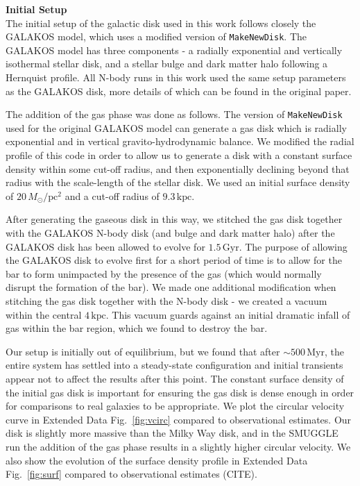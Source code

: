 \documentclass{natureprintstyle}
\begin{document}
\noindent
{\bf Initial Setup}
\\
\noindent
The initial setup of the galactic disk used in this work follows closely the
GALAKOS model\cite{2020ApJ...890..117D}, which uses a modified version of
\texttt{MakeNewDisk}.\cite{2005MNRAS.361..776S} The GALAKOS model has three
components - a radially exponential and vertically isothermal stellar disk,
and a stellar bulge and dark matter halo following a Hernquist
profile.\cite{1990ApJ...356..359H} All N-body runs in this work used the same
setup parameters as the GALAKOS disk, more details of which can be found in
the original paper.

The addition of the gas phase was done as follows. The version of
\texttt{MakeNewDisk} used for the original GALAKOS model can generate a gas
disk which is radially exponential and in vertical gravito-hydrodynamic
balance. We modified the radial profile of this code in order to allow us to
generate a disk with a constant surface density within some cut-off radius,
and then exponentially declining beyond that radius with the scale-length of
the stellar disk. We used an initial surface density of
$20\,M_{\odot}/\textrm{pc}^2$ and a cut-off radius of $9.3\,\textrm{kpc}$.

After generating the gaseous disk in this way, we stitched the gas disk
together with the GALAKOS N-body disk (and bulge and dark matter halo) after
the GALAKOS disk has been allowed to evolve for $1.5\,\textrm{Gyr}$. The
purpose of allowing the GALAKOS disk to evolve first for a short period of
time is to allow for the bar to form unimpacted by the presence of the gas
(which would normally disrupt the formation of the bar). We made one
additional modification when stitching the gas disk together with the N-body
disk - we created a vacuum within the central $4\,\textrm{kpc}$. This vacuum
guards against an initial dramatic infall of gas within the bar region, which
we found to destroy the bar.

Our setup is initially out of equilibrium, but we found that after
$\sim500\,\textrm{Myr}$, the entire system has settled into a steady-state
configuration and initial transients appear not to affect the results after
this point. The constant surface density of the initial gas disk is important
for ensuring the gas disk is dense enough in order for comparisons to real
galaxies to be appropriate. We plot the circular velocity curve in Extended
Data Fig.~\ref{fig:vcirc} compared to observational
estimates.\cite{2019ApJ...871..120E} Our disk is slightly more massive than
the Milky Way disk, and in the SMUGGLE run the addition of the gas phase
results in a slightly higher circular velocity. We also show the evolution of
the surface density profile in Extended Data Fig.~\ref{fig:surf} compared to
observational estimates (CITE).
\end{document}
